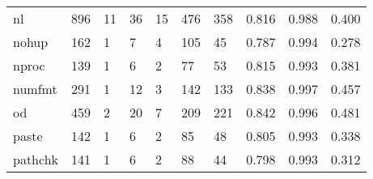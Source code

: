 \begin{longtable}{lp{1.3cm}p{1.3cm}p{1.3cm}p{1.3cm}p{1.3cm}p{1.3cm}p{1.3cm}p{1.3cm}p{1.3cm}}
nl        &                    896 &                                 11 &                                36 &                               15 &                               476 &                             358 &                                   0.816 &                                  0.988 &                                0.400 \\
nohup     &                    162 &                                  1 &                                 7 &                                4 &                               105 &                              45 &                                   0.787 &                                  0.994 &                                0.278 \\
nproc     &                    139 &                                  1 &                                 6 &                                2 &                                77 &                              53 &                                   0.815 &                                  0.993 &                                0.381 \\
numfmt    &                    291 &                                  1 &                                12 &                                3 &                               142 &                             133 &                                   0.838 &                                  0.997 &                                0.457 \\
od        &                    459 &                                  2 &                                20 &                                7 &                               209 &                             221 &                                   0.842 &                                  0.996 &                                0.481 \\
paste     &                    142 &                                  1 &                                 6 &                                2 &                                85 &                              48 &                                   0.805 &                                  0.993 &                                0.338 \\
pathchk   &                    141 &                                  1 &                                 6 &                                2 &                                88 &                              44 &                                   0.798 &                                  0.993 &                                0.312 \\

\end{longtable}
